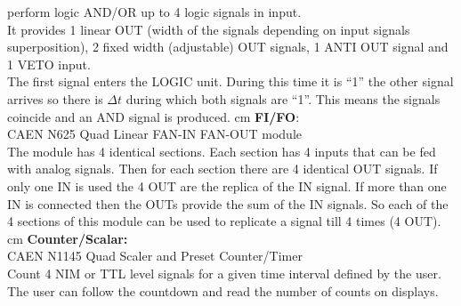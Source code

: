     perform logic AND/OR up to 4 logic signals in input.\\
	It provides 1 linear OUT (width of the signals depending on input signals superposition),
    2 ﬁxed width (adjustable) OUT signals, 1 ANTI OUT signal and 1 VETO input.\\
	The ﬁrst signal enters the LOGIC unit. During this time it is “1” the other signal arrives
    so there is $\Delta t$ during which both signals are “1”. 
    This means the signals coincide and an AND signal is produced.
	 cm
	\textbf{FI/FO}:\\ CAEN N625 Quad Linear FAN-IN FAN-OUT module\\
	The module has 4 identical sections. Each section has 4 inputs that can be fed with analog
    signals. Then for each section there are 4 identical OUT signals. If only one IN is used the
    4 OUT are the replica of the IN signal. If more than one IN is connected then the OUTs provide
    the sum of the IN signals. So each of the 4 sections of this module can be used to replicate 
    a signal till 4 times (4 OUT).
	 cm
	\textbf{Counter/Scalar:}\\ CAEN N1145 Quad Scaler and Preset Counter/Timer\\
	Count 4 NIM or TTL level signals for a given time interval deﬁned by the user.
    The user can follow the countdown and read the number of counts on displays.

